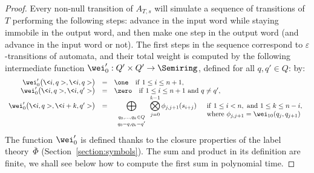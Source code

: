 \begin{proof}
Every non-null transition of $A_{T, s}$ will
simulate a sequence of transitions of $T$ performing the following steps:
advance in the input word while staying immobile in the output word, 
and then make one step in the output word (and advance in the input word or not).
%
The first steps in the sequence correspond to $\varepsilon$-transitions of automata, 
and their total weight is computed by the following intermediate function 
$\wei'_0 : Q' \times Q' \to \Semiring$, 
defined for all $q, q' \in Q$: %
by:
\[
\begin{array}{rcl}
\wei'_0\bigl(\<i, q>, \< i, q>\bigr) & = & \one 
\quad \mathrm{if~} 1 \leq i \leq n+1,\\
%
\wei'_0\bigl(\<i, q>, \< i, q'>\bigr) & = & \zero 
\quad \mathrm{if~} 1 \leq i \leq n+1 \mathrm{~and~} q \neq q',\\
%
\wei'_0\bigl(\<i, q>, \< i+k, q'>\bigr) & = & 
\displaystyle
\bigoplus_{\begin{array}{c}
           \scriptstyle q_0,\ldots, q_k \in Q\\[-2pt]
           \scriptstyle q_0 = q, q_k = q'
           \end{array}} 
\bigotimes_{j=0}^{k-1} \phi_{j, j+1}(s_{i+j})
\quad \begin{array}[t]{l}
      \mathrm{if~} 1 \leq i < n,
      \mathrm{~and~} 1 \leq k \leq n-i,\\
      \mathrm{where~} \phi_{j, j+1} = \wei_{10}(q_j, q_{j+1})
      \end{array}
\end{array}
\]
%
The function $\wei'_0$ is defined thanks to the closure properties of the label theory~$\bar\Phi$
(Section~\ref{section:symbols}). 
The sum and product in its definition are finite, 
we shall see below how to compute the first sum in polynomial time.


\end{proof}
